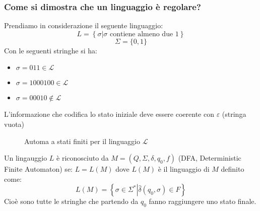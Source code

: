 \documentclass[a4paper]{article}
\begin{document}
\subsubsection{Come si dimostra che un linguaggio è regolare?}
\begin{example}
  Prendiamo in considerazione il seguente linguaggio:
  \[
    L = \left\{ \sigma  \left| \sigma \text{ contiene almeno due } 1 \right. \right\}
  \] 
  \[
    \Sigma = \{0,1\}
  \] 
  Con le seguenti stringhe si ha:
  \begin{itemize}
    \item \( \sigma = 011 \in \mathcal{L} \) 
    \item \( \sigma = 1000100 \in \mathcal{L} \) 
    \item \( \sigma = 00010 \notin \mathcal{L} \) 
  \end{itemize}
  L'informazione che codifica lo stato iniziale deve essere coerente con \( \varepsilon  \) 
  (stringa vuota)
  \begin{figure}[H]
    \centering
    \caption{Automa a stati finiti per il linguaggio \( \mathcal{L} \)}
  \end{figure}
\end{example}
Un lingauggio \( L \) è riconosciuto da \( M = \left( Q, \Sigma, \delta, q_0, f \right)  \) (DFA, Deterministic Finite Automaton) se:
\( L = L(M) \) dove \( L(M) \) è il linguaggio di \( M \) definito come:
\[
  L(M) = \left\{ \sigma  \in \Sigma^* \left| \hat{\delta}(q_0, \sigma) \in F \right. \right\}
\] 
Cioè sono tutte le stringhe che partendo da \( q_0 \) fanno raggiungere uno stato finale.
\end{document}
